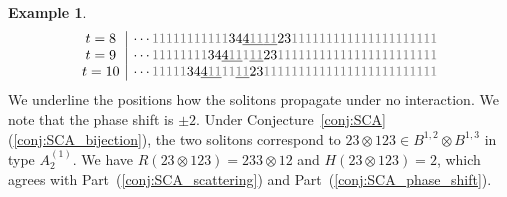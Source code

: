 \documentclass[reqno]{amsart}
\theoremstyle{plain}
\theoremstyle{definition}
\newtheorem{ex}[thm]{Example}
\numberwithin{equation}{section}
\begin{document}
\begin{ex}
\[{\begin{array}{c|c}
t = 8 & \cdots {\color{gray} 1} {\color{gray} 1} {\color{gray} 1} {\color{gray} 1} {\color{gray} 1} {\color{gray} 1} {\color{gray} 1} {\color{gray} 1} {\color{gray} 1} {\color{gray} 1} {\color{gray} 1} 3 4 \underline{4 {\color{gray} 1} {\color{gray} 1}} \underline{{\color{gray} 1} {\color{gray} 1}} 2 3 {\color{gray} 1} {\color{gray} 1} {\color{gray} 1} {\color{gray} 1} {\color{gray} 1} {\color{gray} 1} {\color{gray} 1} {\color{gray} 1} {\color{gray} 1} {\color{gray} 1} {\color{gray} 1} {\color{gray} 1} {\color{gray} 1} {\color{gray} 1} {\color{gray} 1} {\color{gray} 1} {\color{gray} 1} {\color{gray} 1} {\color{gray} 1} {\color{gray} 1} {\color{gray} 1} \\
t = 9 & \cdots {\color{gray} 1} {\color{gray} 1} {\color{gray} 1} {\color{gray} 1} {\color{gray} 1} {\color{gray} 1} {\color{gray} 1} {\color{gray} 1} 3 4 \underline{4 {\color{gray} 1} {\color{gray} 1}} {\color{gray} 1} \underline{{\color{gray} 1} {\color{gray} 1}} 2 3 {\color{gray} 1} {\color{gray} 1} {\color{gray} 1} {\color{gray} 1} {\color{gray} 1} {\color{gray} 1} {\color{gray} 1} {\color{gray} 1} {\color{gray} 1} {\color{gray} 1} {\color{gray} 1} {\color{gray} 1} {\color{gray} 1} {\color{gray} 1} {\color{gray} 1} {\color{gray} 1} {\color{gray} 1} {\color{gray} 1} {\color{gray} 1} {\color{gray} 1} {\color{gray} 1} {\color{gray} 1} {\color{gray} 1} \\
t = 10 & \cdots {\color{gray} 1} {\color{gray} 1} {\color{gray} 1} {\color{gray} 1} {\color{gray} 1} 3 4 \underline{4 {\color{gray} 1} {\color{gray} 1}} {\color{gray} 1} {\color{gray} 1} \underline{{\color{gray} 1} {\color{gray} 1}} 2 3 {\color{gray} 1} {\color{gray} 1} {\color{gray} 1} {\color{gray} 1} {\color{gray} 1} {\color{gray} 1} {\color{gray} 1} {\color{gray} 1} {\color{gray} 1} {\color{gray} 1} {\color{gray} 1} {\color{gray} 1} {\color{gray} 1} {\color{gray} 1} {\color{gray} 1} {\color{gray} 1} {\color{gray} 1} {\color{gray} 1} {\color{gray} 1} {\color{gray} 1} {\color{gray} 1} {\color{gray} 1} {\color{gray} 1} {\color{gray} 1} {\color{gray} 1} \\
\end{array}}
\]
We underline the positions how the solitons propagate under no interaction.
We note that the phase shift is $\pm 2$.
Under Conjecture~\ref{conj:SCA}(\ref{conj:SCA_bijection}), the two solitons correspond to $23 \otimes 123 \in B^{1,2} \otimes B^{1,3}$ in type $A_2^{(1)}$.
We have $R(23 \otimes 123) = 233 \otimes 12$ and $H(23 \otimes 123) = 2$, which agrees with Part~(\ref{conj:SCA_scattering}) and Part~(\ref{conj:SCA_phase_shift}).
\end{ex}
\end{document}

